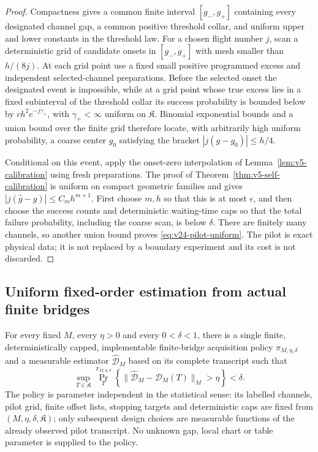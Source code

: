 \begin{proof}
Compactness gives a common finite interval \([g_-,g_+]\) containing every
designated channel gap, a common positive threshold collar, and uniform upper
and lower constants in the threshold law.  For a chosen flight number \(j\),
scan a deterministic grid of candidate onsets in \([g_-,g_+]\) with mesh
smaller than \(h/(8j)\).  At each grid point use a fixed small positive
programmed excess and independent selected-channel preparations.  Before the
selected onset the designated event is impossible, while at a grid point
whose true excess lies in a fixed subinterval of the threshold collar its
success probability is bounded below by
\(c h^2e^{-j\gamma_+}\), with \(\gamma_+<\infty\) uniform on
\(\mathfrak K\).  Binomial exponential bounds and a union bound over the
finite grid therefore locate, with arbitrarily high uniform probability, a
coarse center \(g_0\) satisfying the bracket
\(|j(g-g_0)|\le h/4\).

Conditional on this event, apply the onset-zero interpolation of
Lemma~\ref{lem:v5-calibration} using fresh preparations.  The proof of
Theorem~\ref{thm:v5-self-calibration} is uniform on compact geometric
families and gives
\(|j(\widehat g-g)|\le C_mh^{m+1}\).  First choose \(m,h\) so that this is at
most \(\epsilon\), and then choose the success counts and deterministic
waiting-time caps so that the total failure probability, including the coarse
scan, is below \(\delta\).  There are finitely many channels, so another union
bound proves \eqref{eq:v24-pilot-uniform}.  The pilot is exact physical data;
it is not replaced by a boundary experiment and its cost is not discarded.
\end{proof}

\subsection{Uniform fixed-order estimation from actual finite bridges}

\begin{theorem}
\label{thm:v24-fixed-M-physical-estimability}
For every fixed \(M\), every \(\eta>0\) and every \(0<\delta<1\), there is a
single finite, deterministically capped, implementable finite-bridge
acquisition policy \(\pi_{M,\eta,\delta}\) and a measurable estimator
\(\widehat{\mathcal D}_M\) based on its complete transcript such that
\begin{equation}\label{eq:v24-fixed-M-uniform}
 \sup_{T\in\mathfrak K}
 \Pr_T^{\pi_{M,\eta,\delta}}
 \left\{
  \|\widehat{\mathcal D}_M-\mathcal D_M(T)\|_M>\eta
 \right\}<\delta.
\end{equation}
The policy is parameter independent in the statistical sense: its labelled
channels, pilot grid, finite offset lists, stopping targets and deterministic
caps are fixed from \((M,\eta,\delta,\mathfrak K)\); only subsequent design
choices are measurable functions of the already observed pilot transcript.
No unknown gap, local chart or table parameter is supplied to the policy.
\end{theorem}

